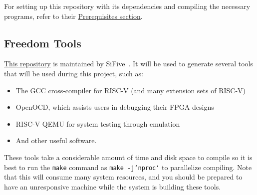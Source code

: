 For setting up this repository with its dependencies and compiling the necessary programs, refer to their \href{https://github.com/sifive/freedom-e-sdk#setting-up-the-sdk}{Prerequisites section}.

\subsection{Freedom Tools}\label{sec:Freedom_Tools}
\href{https://github.com/sifive/freedom-tools}{This repository} is maintained by SiFive~\cite{freedomTools}.
It will be used to generate several tools that will be used during this project, such as:
\begin{itemize}
\item The GCC cross-compiler for RISC-V (and many extension sets of RISC-V)
\item OpenOCD, which assists users in debugging their FPGA designs
\item RISC-V QEMU for system testing through emulation
\item And other useful software.
\end{itemize}

These tools take a considerable amount of time and disk space to compile so it is best to run the \texttt{make} command as \texttt{make -j`nproc`} to parallelize compiling.
Note that this will consume many system resources, and you should be prepared to have an unresponsive machine while the system is building these tools.

